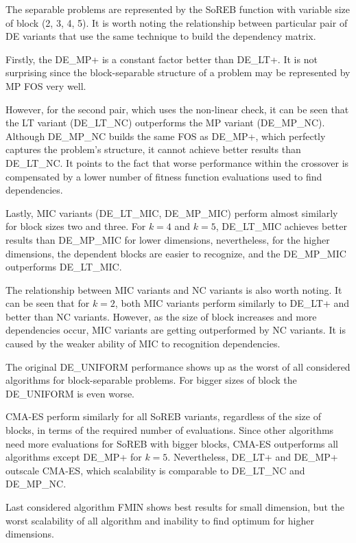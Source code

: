 The separable problems are represented by the SoREB function with variable size of block
(2, 3, 4, 5). It is worth noting the relationship between particular pair of DE variants
that use the same technique to build the dependency matrix.

Firstly, the DE\_MP+ is a constant factor better than DE\_LT+. It is not surprising since
the block-separable structure of a problem may be represented by MP FOS very well.

However, for the second pair, which uses the non-linear check, it can be seen that the LT variant
(DE\_LT\_NC) outperforms the MP variant (DE\_MP\_NC). Although DE\_MP\_NC builds the same FOS as
DE\_MP+, which perfectly captures the problem's structure, it cannot achieve better
results than DE\_LT\_NC. It points to the fact that worse performance within the crossover
is compensated by a lower number of fitness function evaluations used to find dependencies.

Lastly, MIC variants (DE\_LT\_MIC, DE\_MP\_MIC) perform almost similarly for block sizes two
and three. For $k = 4$ and $k = 5$, DE\_LT\_MIC achieves better results than DE\_MP\_MIC
for lower dimensions,
nevertheless, for the higher dimensions, the dependent blocks are easier to
recognize, and the DE\_MP\_MIC outperforms DE\_LT\_MIC.

The relationship between MIC variants and NC variants is also worth noting. It can be seen
that for $k = 2$, both MIC variants perform similarly to DE\_LT+ and better than NC variants.
However, as the size of block increases and more dependencies occur, MIC variants are getting
outperformed by NC variants. It is caused by the weaker ability of MIC to recognition dependencies.

The original DE\_UNIFORM performance shows up as the worst of all considered algorithms for
block-separable problems. For bigger sizes of block the DE\_UNIFORM is even worse.

CMA-ES perform similarly for all SoREB variants, regardless of the size of blocks, in
terms of the required number of evaluations. Since other algorithms need more evaluations
for SoREB with bigger blocks, CMA-ES outperforms all algorithms except DE\_MP+ for
$k = 5$. Nevertheless, DE\_LT+ and DE\_MP+ outscale CMA-ES, which scalability is
comparable to DE\_LT\_NC and DE\_MP\_NC.

Last considered algorithm FMIN shows best results for small dimension, but the worst
scalability of all algorithm and inability to find optimum for higher dimensions.

